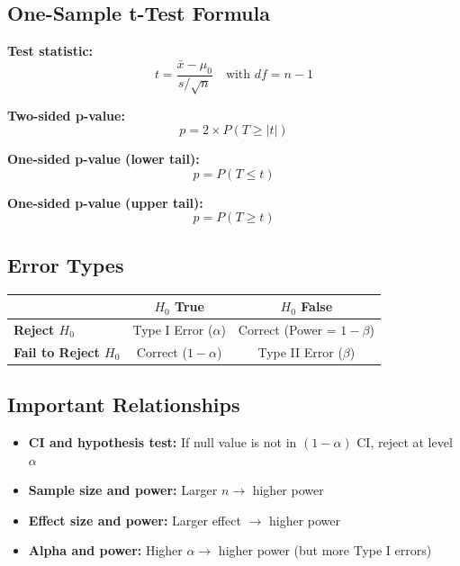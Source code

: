 \documentclass[11pt]{article}
\begin{document}
\subsection*{One-Sample t-Test Formula}

\textbf{Test statistic:}
$$t = \frac{\bar{x} - \mu_0}{s / \sqrt{n}} \quad \text{with } df = n - 1$$

\textbf{Two-sided p-value:}
$$p = 2 \times P(T \geq |t|)$$

\textbf{One-sided p-value (lower tail):}
$$p = P(T \leq t)$$

\textbf{One-sided p-value (upper tail):}
$$p = P(T \geq t)$$

\subsection*{Error Types}

\begin{center}
\begin{tabular}{lcc}
\toprule
& \textbf{$H_0$ True} & \textbf{$H_0$ False} \\
\midrule
\textbf{Reject $H_0$} & Type I Error ($\alpha$) & Correct (Power = $1-\beta$) \\
\textbf{Fail to Reject $H_0$} & Correct ($1-\alpha$) & Type II Error ($\beta$) \\
\bottomrule
\end{tabular}
\end{center}

\subsection*{Important Relationships}

\begin{itemize}
\item \textbf{CI and hypothesis test:} If null value is not in $(1-\alpha)$ CI, reject at level $\alpha$
\item \textbf{Sample size and power:} Larger $n \to$ higher power
\item \textbf{Effect size and power:} Larger effect $\to$ higher power
\item \textbf{Alpha and power:} Higher $\alpha \to$ higher power (but more Type I errors)
\end{itemize}
\end{document}
